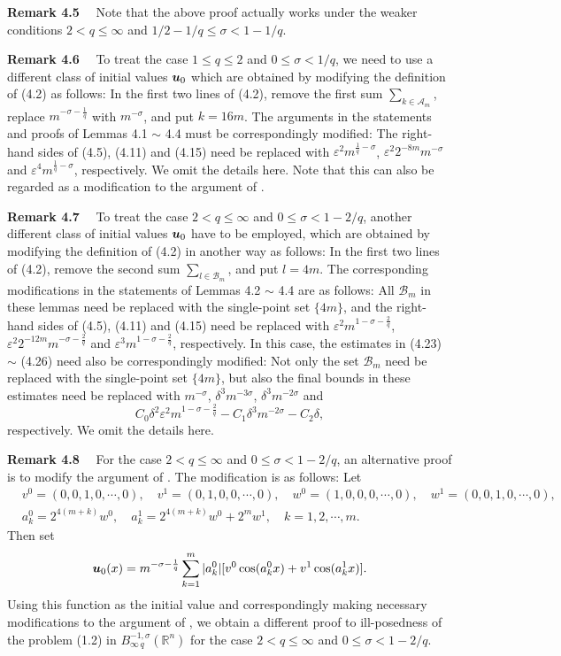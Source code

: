 \documentclass[11pt]{article}
\newcommand{\bfu}{{\mbox{\boldmath $u$}}}
\begin{document}
  {\bf Remark 4.5} \ \ Note that the above proof actually works under the weaker conditions $2<q\leqslant\infty$ and $1/2-1/q\leqslant\sigma<1-1/q$.
\medskip

  {\bf Remark 4.6} \ \ To treat the case $1\leqslant q\leqslant 2$ and $0\leqslant\sigma<1/q$, we need to use a different class of initial values
  $\bfu_0$ which are obtained by modifying the definition of (4.2) as follows: In the first two lines of (4.2), remove the first sum $\displaystyle
  \sum_{k\in\mathscr{A}_m}$, replace $m^{-\sigma-\frac{1}{q}}$ with $m^{-\sigma}$, and put $k=16m$. The arguments in the statements and proofs of
  Lemmas 4.1 $\sim$ 4.4 must be correspondingly modified: The right-hand sides of (4.5), (4.11) and (4.15) need be replaced with $\varepsilon^2
  m^{\frac{1}{q}-\sigma}$, $\varepsilon^2 2^{-8m}m^{-\sigma}$ and $\varepsilon^4 m^{\frac{1}{q}-\sigma}$, respectively. We omit the details here.
  Note that this can also be regarded as a modification to the argument of \cite{Wang}.
\medskip

  {\bf Remark 4.7} \ \ To treat the case $2<q\leqslant\infty$ and $0\leqslant\sigma<1-2/q$, another different class of initial values $\bfu_0$ have
  to be employed, which are obtained by modifying the definition of (4.2) in another way as follows: In the first two lines of (4.2), remove the
  second sum $\displaystyle\sum_{l\in\mathscr{B}_m}$, and put $l=4m$. The corresponding modifications in the statements of Lemmas 4.2
  $\sim$ 4.4 are as follows: All $\mathscr{B}_m$ in these lemmas need be replaced with the single-point set $\{4m\}$, and the right-hand sides of
  (4.5), (4.11) and (4.15) need be replaced with $\varepsilon^2m^{1-\sigma-\frac{2}{q}}$, $\varepsilon^2 2^{-12m}m^{-\sigma-\frac{2}{q}}$ and
  $\varepsilon^3 m^{1-\sigma-\frac{2}{q}}$, respectively. In this case, the estimates in (4.23) $\sim$ (4.26) need also be correspondingly modified:
  Not only the set $\mathscr{B}_m$ need be replaced with the single-point set $\{4m\}$, but also the final bounds in these estimates need be replaced
  with $m^{-\sigma}$, $\delta^3m^{-3\sigma}$, $\delta^3m^{-2\sigma}$ and
$$
  C_0\delta^2\varepsilon^2 m^{1-\sigma-\frac{2}{q}}-C_1\delta^3 m^{-2\sigma}-C_2\delta,
$$
  respectively. We omit the details here.
\medskip

  {\bf Remark 4.8} \ \ For the case $2<q\leqslant\infty$ and $0\leqslant\sigma<1-2/q$, an alternative proof is to modify the argument of
  \cite{Yon10}. The modification is as follows: Let
\begin{eqnarray*}
  & v^0=(0,0,1,0,\cdots,0), \quad  v^1=(0,1,0,0,\cdots,0), \quad w^0=(1,0,0,0,\cdots,0), \quad  w^1=(0,0,1,0,\cdots,0), &
\\
  & a_k^0=2^{4(m+k)}w^0, \quad  a_k^1=2^{4(m+k)}w^0+2^{m}w^1,  \quad k=1,2,\cdots,m.
\end{eqnarray*}
  Then set
$$
  \bfu_0(x)=m^{-\sigma-\frac{1}{q}}\sum_{k=1}^m|a_k^0|[v^0\cos(a_k^0x)+v^1\cos(a_k^1x)].
$$
  Using this function as the initial value and correspondingly making necessary modifications to the argument of \cite{Yon10}, we obtain a different
  proof to ill-posedness of the problem (1.2) in $B^{-1,\sigma}_{\infty\, q}(\mathbb{R}^n)$ for the case $2<q\leqslant\infty$ and
  $0\leqslant\sigma<1-2/q$.
\medskip
\end{document}
